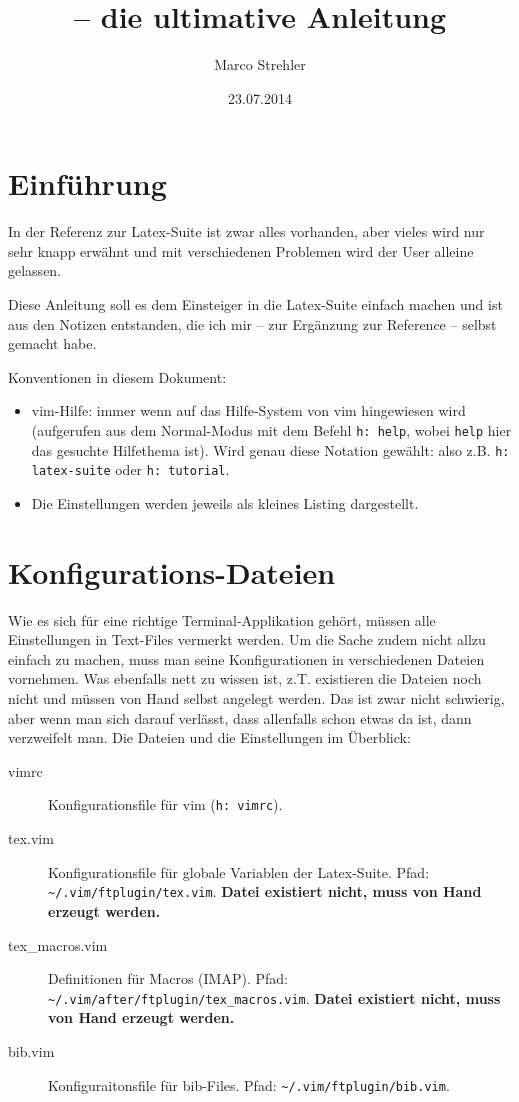 \documentclass[a4paper,parskip=half,draft=true,DIV=15]{scrartcl}
\title{\LS{} -- die ultimative Anleitung}
\author{Marco Strehler}
\date{23.07.2014}
\newcommand{\LS}{Latex-Suite}
\newcommand{\vimhNP}[1]{\texttt{h: #1}}
\newcommand{\vimh}[1]{(\vimhNP{#1})}
\begin{document}
 

\maketitle

\section{Einführung}

In der Referenz zur \LS{} ist zwar alles vorhanden, aber vieles wird
nur sehr knapp erwähnt und mit verschiedenen Problemen wird der User alleine
gelassen.

Diese Anleitung soll es dem Einsteiger in die \LS{} einfach machen und
ist aus den Notizen entstanden, die ich mir -- zur Ergänzung zur Reference --
selbst gemacht habe.

Konventionen in diesem Dokument:

\begin{itemize}
  \item vim-Hilfe: immer wenn auf das Hilfe-System von vim hingewiesen wird
    (aufgerufen aus dem Normal-Modus mit dem Befehl \vimhNP{help}, wobei
    \texttt{help} hier das gesuchte Hilfethema ist). Wird genau diese Notation
    gewählt: also z.B. \vimhNP{latex-suite} oder \vimhNP{tutorial}.
  \item Die Einstellungen werden jeweils als kleines Listing dargestellt.
\end{itemize}

\section{Konfigurations-Dateien}

Wie es sich für eine richtige Terminal-Applikation gehört, müssen alle Einstellungen in Text-Files vermerkt werden.
Um die Sache zudem nicht allzu einfach zu machen, muss man seine Konfigurationen in verschiedenen Dateien vornehmen.
Was ebenfalls nett zu wissen ist, z.T. existieren die Dateien noch nicht und müssen von Hand selbst angelegt werden.
Das ist zwar nicht schwierig, aber wenn man sich darauf verlässt, dass allenfalls schon etwas da ist, dann verzweifelt man.
Die Dateien und die Einstellungen im Überblick:

\begin{description}
  \item[vimrc] Konfigurationsfile für vim \vimh{vimrc}.
  \item[tex.vim] Konfigurationsfile für globale Variablen der \LS.
    Pfad: \texttt{\textasciitilde/.vim/ftplugin/tex.vim}. \textbf{Datei existiert nicht, muss von Hand erzeugt werden.}
  \item[tex\_macros.vim] Definitionen für Macros (IMAP).
    Pfad: \texttt{\textasciitilde/.vim/after/ftplugin/tex\_macros.vim}. \textbf{Datei existiert nicht, muss von Hand erzeugt werden.}
	\item[bib.vim] Konfiguraitonsfile für bib-Files.
	  Pfad: \texttt{\textasciitilde/.vim/ftplugin/bib.vim}.
\end{description}
\end{document}
